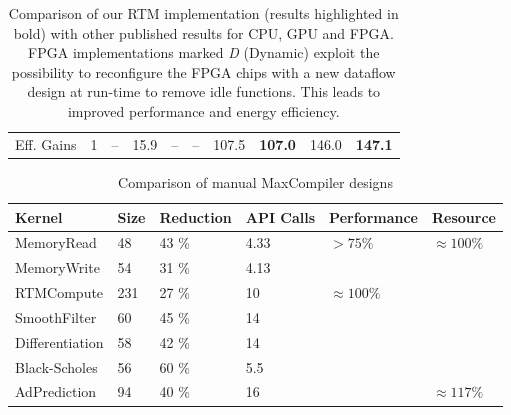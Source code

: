 \documentclass[a4paper, 11]{article}
\begin{document}
\begin{table}[!ht]
{\begin{tabularx}{\linewidth}{c|X|X|X|X|X|X|X|X|X}
    Eff. Gains & 1           & --        &    15.9          &        --      & --            & 107.5              & \textbf{107.0}     & 146.0             & \textbf{147.1}     \\
  \end{tabularx}
  \caption{Comparison of our RTM implementation (results highlighted in bold) with other published results for CPU, GPU and FPGA.
 FPGA implementations marked \emph{D} (Dynamic) exploit the possibility to reconfigure the FPGA chips with a new dataflow design at run-time to remove idle functions. This leads to improved performance and energy efficiency.}
  \label{table:rtm-performance}
}
\end{table}

\begin{table}[!ht] {\small
    \renewcommand{\arraystretch}{1.5} \begin{tabularx}{\linewidth}{X|X|X|X|X|X}
      \textbf{Kernel} & \textbf{Size} & \textbf{Reduction} &
      \textbf{API Calls} & \textbf{Performance} & \textbf{Resource}
      \\
      \hline\hline
      MemoryRead       & 48 & 43 \%               & 4.33                     & \multirow{2}{1.5cm}{$ > 75\%$}        & \multirow{6}{1.5cm}{$\approx 100\%$} \\
      MemoryWrite      & 54  & 31 \%              & 4.13                     &                                   &                              \\
      \cline{1-4}
      RTMCompute            & 231 & 27 \%              & 10                       & \multirow{5}{1.5cm}{$ \approx 100\%$} &                              \\
      SmoothFilter      & 60 & 45 \%              & 14                       &                                   &                              \\
      Differentiation       & 58 & 42 \%              & 14                       &                                   &                              \\
      Black-Scholes & 56  & 60 \%               & 5.5                      &                                   &                              \\
      \cline{5-5}
      AdPrediction & 94 & 40 \%             & 16                       &                                   &    $ \approx 117 \% $                          \\
    \end{tabularx} \caption{Comparison of manual MaxCompiler designs
}}
\end{table}
\end{document}
